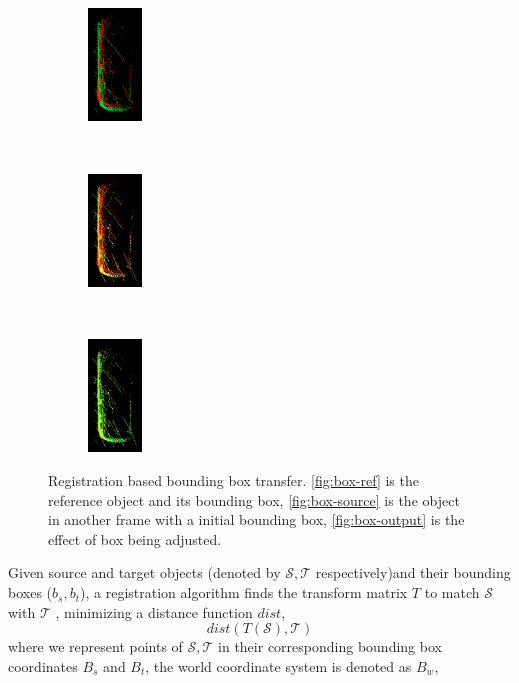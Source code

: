 \documentclass[letterpaper, 10 pt, conference]{ieeeconf}  %
\begin{document}
\begin{figure}[ht]
	\begin{subfigure}[t]{0.18\linewidth}
		\includegraphics[height=3cm]{./figures/reg-input}\\
		\caption{}\label{fig:reg-input}
	\end{subfigure}\hfill
	~
	\begin{subfigure}[t]{0.18\linewidth}
		\includegraphics[height=3cm]{./figures/reg-tran}\\
		\caption{}\label{fig:reg-tran}
	\end{subfigure}\hfill
	~
	\begin{subfigure}[t]{0.18\linewidth}
		\includegraphics[height=3cm]{./figures/reg-result}\\
		\caption{}\label{fig:reg-output}
	\end{subfigure}\hfill

	
	\caption{Registration based bounding box transfer. \ref{fig:box-ref} is the reference object and its bounding box, \ref{fig:box-source} is the object in another frame with a initial  bounding box, \ref{fig:box-output} is the effect of box being adjusted.}
\end{figure}


Given source and target objects (denoted by $\mathcal{S,T}$ respectively)and their bounding boxes ($b_s,b_t$), a registration algorithm finds the transform matrix $T$ to match $\mathcal{S}$ with $\mathcal{T}$ , minimizing a distance function $dist$,
$$dist(T(\mathcal{S}),\mathcal{T})$$
where we represent points of $\mathcal{S,T}$ in their corresponding bounding box coordinates $B_s$ and $B_t$, the world coordinate system is denoted as $B_w$,
\end{document}

